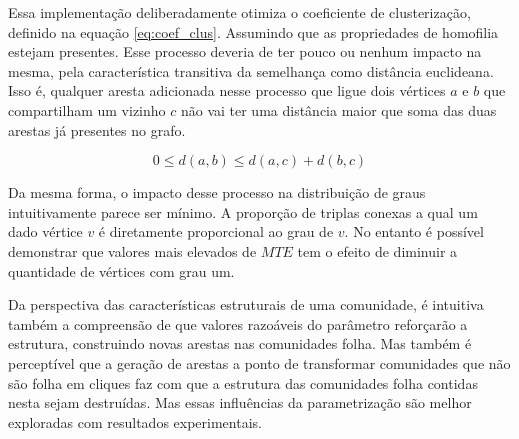 \documentclass[notes.tex]{subfiles}
\begin{document}
Essa implementação deliberadamente otimiza o coeficiente de clusterização, definido na equação \ref{eq:coef_clus}.
Assumindo que as propriedades de homofilia estejam presentes.
Esse processo deveria de ter pouco ou nenhum impacto na mesma, pela característica transitiva da semelhança como distância euclideana.
Isso é, qualquer aresta adicionada nesse processo que ligue dois vértices  $a$ e  $b$ que compartilham um vizinho  $c$ não vai ter uma distância maior que soma das duas arestas já presentes no grafo.

\begin{equation}
0 \le d(a, b) \le d(a, c) + d(b, c)
\end{equation}

Da mesma forma, o impacto desse processo na distribuição de graus intuitivamente parece ser mínimo.
A proporção de triplas conexas a qual um dado vértice $v$ é diretamente proporcional ao grau de $v$. 
No entanto é possível demonstrar que valores mais elevados de $MTE$ tem o efeito de diminuir a quantidade de vértices com grau um.

Da perspectiva das características estruturais de uma comunidade, é intuitiva também a compreensão de que valores razoáveis do parâmetro reforçarão a estrutura, construindo novas arestas nas comunidades folha.
Mas também é perceptível que a geração de arestas a ponto de transformar comunidades que não são folha em cliques faz com que a estrutura das comunidades folha contidas nesta sejam destruídas.
Mas essas influências da parametrização são melhor exploradas com resultados experimentais.
\end{document}
